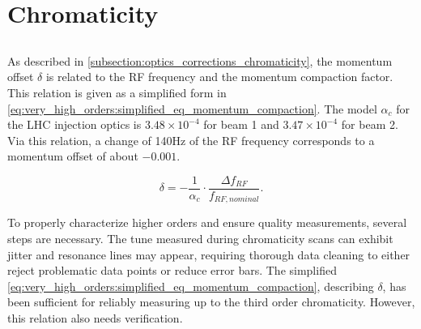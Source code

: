 \section{Chromaticity}


\subsection{}
\label{subsection:decapoles:chromaticity:measurement}

As described in \cref{subsection:optics_corrections_chromaticity}, the momentum offset $\delta$ is
related to the RF frequency and the momentum compaction factor. This relation is given as a
simplified form in \cref{eq:very_high_orders:simplified_eq_momentum_compaction}. 
The model $\alpha_c$ for the LHC injection optics is $3.48 \times 10^{-4}$ for beam 1 and $3.47
\times 10^{-4}$ for beam 2.  Via this relation, a change of 140Hz of the RF frequency corresponds to
a momentum offset of about $-0.001$.

\begin{equation}
    \delta = -\frac{1}{\alpha_c} \cdot \frac{\Delta f_{RF}}{f_{RF,nominal}}.
    \label{eq:very_high_orders:simplified_eq_momentum_compaction}
\end{equation}

%

To properly characterize higher orders and ensure quality measurements, several steps are necessary.
The tune measured during chromaticity scans can exhibit jitter and resonance lines may appear,
requiring thorough data cleaning to either reject problematic data points or reduce error bars. 
The simplified \cref{eq:very_high_orders:simplified_eq_momentum_compaction}, describing $\delta$,
has been sufficient for reliably measuring up to the third order chromaticity. However, this
relation also needs verification.




